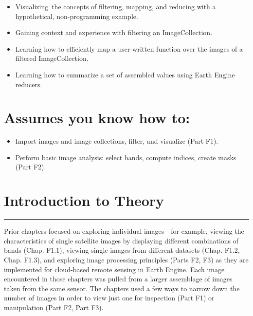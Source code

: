 \documentclass[
  letterpaper,
  DIV=11,
  numbers=noendperiod]{scrreprt}
\providecommand{\tightlist}{%
  \setlength{\itemsep}{0pt}\setlength{\parskip}{0pt}}\usepackage{longtable,booktabs,array}
\begin{document}

\begin{itemize}
\tightlist
\item
  Visualizing~the concepts of filtering, mapping, and reducing with a
  hypothetical, non-programming example.
\item
  Gaining context and experience with filtering an ImageCollection.
\item
  Learning how to efficiently map a user-written function over the
  images of a filtered ImageCollection.
\item
  Learning how to summarize a set of assembled values using Earth Engine
  reducers.
\end{itemize}

\hypertarget{assumes-you-know-how-to-7}{%
\section*{Assumes you know how to:}\label{assumes-you-know-how-to-7}}


\begin{itemize}
\tightlist
\item
  Import images and image collections, filter, and visualize (Part F1).
\item
  Perform basic image analysis: select bands, compute indices, create
  masks (Part F2).
\end{itemize}

\hypertarget{introduction-to-theory-3}{%
\section*{Introduction to Theory}\label{introduction-to-theory-3}}


\begin{center}\rule{0.5\linewidth}{0.5pt}\end{center}

Prior chapters focused on exploring individual images---for example,
viewing the characteristics of single satellite images by displaying
different combinations of bands (Chap. F1.1), viewing single images from
different datasets (Chap. F1.2, Chap. F1.3), and exploring image
processing principles (Parts F2, F3) as they are implemented for
cloud-based remote sensing in Earth Engine. Each image encountered in
those chapters was pulled from a larger assemblage of images taken from
the same sensor. The chapters used a few ways to narrow down the number
of images in order to view just one for inspection (Part F1) or
manipulation (Part F2, Part F3).
\end{document}
